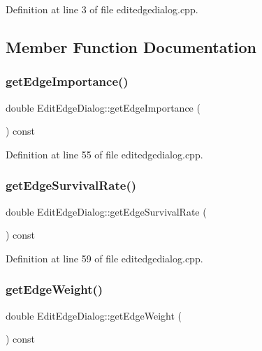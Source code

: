 Definition at line 3 of file editedgedialog.\+cpp.



\subsection{Member Function Documentation}
\mbox{\label{class_edit_edge_dialog_a0a22d131d347363511e010557581f60b}} 
\subsubsection{\texorpdfstring{get\+Edge\+Importance()}{getEdgeImportance()}}
{\footnotesize\ttfamily double Edit\+Edge\+Dialog\+::get\+Edge\+Importance (\begin{DoxyParamCaption}{ }\end{DoxyParamCaption}) const}



Definition at line 55 of file editedgedialog.\+cpp.

\mbox{\label{class_edit_edge_dialog_a211adaab8e8221e69cbc8e3e3f19f83a}} 
\subsubsection{\texorpdfstring{get\+Edge\+Survival\+Rate()}{getEdgeSurvivalRate()}}
{\footnotesize\ttfamily double Edit\+Edge\+Dialog\+::get\+Edge\+Survival\+Rate (\begin{DoxyParamCaption}{ }\end{DoxyParamCaption}) const}



Definition at line 59 of file editedgedialog.\+cpp.

\mbox{\label{class_edit_edge_dialog_a0342c98517f14a49fd2f40d01e400154}} 
\subsubsection{\texorpdfstring{get\+Edge\+Weight()}{getEdgeWeight()}}
{\footnotesize\ttfamily double Edit\+Edge\+Dialog\+::get\+Edge\+Weight (\begin{DoxyParamCaption}{ }\end{DoxyParamCaption}) const}



